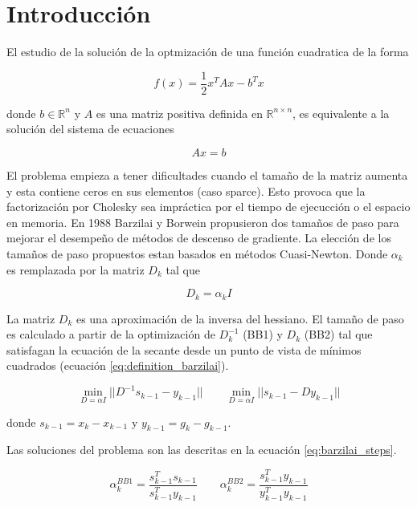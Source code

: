 \section*{Introducción}

El estudio de la solución de la optmización de una función cuadratica de la forma

\begin{equation}
    f(x) = \frac{1}{2}x^TAx- b^Tx \label{eq:quadratic_function}
\end{equation}

donde $b\in\mathbb{R}^n$ y $A$ es una matriz positiva definida en $\mathbb{R}^{n\times n}$, es equivalente a la solución del sistema de ecuaciones

\begin{equation*}
    Ax=b
\end{equation*}

El problema empieza a tener dificultades cuando el tamaño de la matriz aumenta y esta contiene ceros en sus elementos (caso sparce). Esto provoca que la factorización por Cholesky sea impráctica por el tiempo de ejecucción o el espacio en memoria.  En 1988 Barzilai y Borwein\cite{barzilai_1988} propusieron dos tamaños de paso para mejorar el desempeño de métodos de descenso de gradiente. La elección de los tamaños de paso propuestos estan basados en métodos Cuasi-Newton. Donde $\alpha_k$ es remplazada por la matriz $D_k$ tal que

\begin{equation}
    D_k = \alpha_k \mathit{I}
\end{equation}

La matriz $D_k$ es una aproximación de la inversa del hessiano. El tamaño de paso es calculado a partir de la optimización de $D_k^{-1}$  (BB1) y  $D_k$ (BB2) tal que satisfagan la ecuación de la secante desde un punto de vista de mínimos cuadrados (ecuación \ref{eq:definition_barzilai}).

\begin{equation}
    \min_{D=\alpha \mathit{I}} ||D^{-1}s_{k-1}-y_{k-1}|| \qquad \min_{D=\alpha \mathit{I}} ||s_{k-1}-Dy_{k-1}|| \label{eq:definition_barzilai}
\end{equation}

donde $s_{k-1} = x_k - x_{k-1}$ y $y_{k-1} = g_k - g_{k-1}$.

Las soluciones del problema son las descritas en la ecuación \ref{eq:barzilai_steps}.

\begin{equation}
    \alpha^{BB1}_k = \frac{s^T_{k-1}s_{k-1}}{s^T_{k-1}y_{k-1}} \qquad \alpha_k^{BB2} = \frac{s_{k-1}^Ty_{k-1}}{y_{k-1}^Ty_{k-1}} \label{eq:barzilai_steps}
\end{equation}

